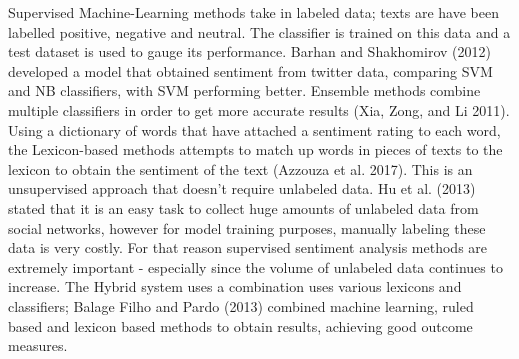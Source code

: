 \documentclass[
]{article}
\begin{document}
Supervised Machine-Learning methods take in labeled data; texts are have
been labelled positive, negative and neutral. The classifier is trained
on this data and a test dataset is used to gauge its performance. Barhan
and Shakhomirov (2012) developed a model that obtained sentiment from
twitter data, comparing SVM and NB classifiers, with SVM performing
better. Ensemble methods combine multiple classifiers in order to get
more accurate results (Xia, Zong, and Li 2011). Using a dictionary of
words that have attached a sentiment rating to each word, the
Lexicon-based methods attempts to match up words in pieces of texts to
the lexicon to obtain the sentiment of the text (Azzouza et al. 2017).
This is an unsupervised approach that doesn't require unlabeled data. Hu
et al. (2013) stated that it is an easy task to collect huge amounts of
unlabeled data from social networks, however for model training
purposes, manually labeling these data is very costly. For that reason
supervised sentiment analysis methods are extremely important -
especially since the volume of unlabeled data continues to increase. The
Hybrid system uses a combination uses various lexicons and classifiers;
Balage Filho and Pardo (2013) combined machine learning, ruled based and
lexicon based methods to obtain results, achieving good outcome
measures.
\end{document}
